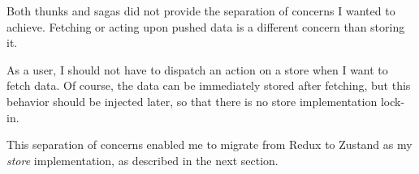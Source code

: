 Both thunks and sagas did not provide the separation of concerns
I wanted to achieve.
Fetching or acting upon pushed data
is a different concern than storing it.

As a user,
I should not have to dispatch an action on a store
when I want to fetch data.
Of course, the data can be immediately stored after fetching,
but this behavior should be injected later,
so that there is no store implementation lock-in.

This separation of concerns enabled me to
migrate from Redux to Zustand as my \emph{store} implementation,
as described in the next section.
